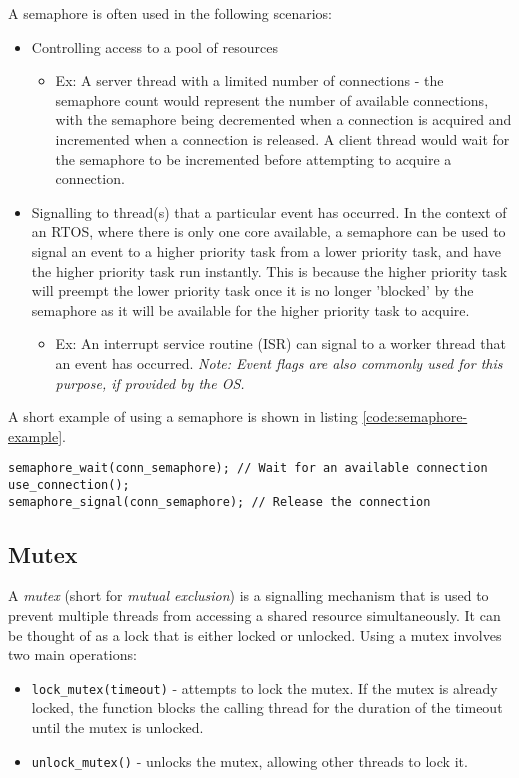 \documentclass[main.tex]{subfiles}
\begin{document}
\noindent A semaphore is often used in the following scenarios:
\begin{itemize}
    \item Controlling access to a pool of resources 
    \begin{itemize}
        \item Ex: A server thread with a limited number of connections - the semaphore count would represent the number of available connections, with the semaphore being decremented when a connection is acquired and incremented when a connection is released. A client thread would wait for the semaphore to be incremented before attempting to acquire a connection.
    \end{itemize}
    \item Signalling to thread(s) that a particular event has occurred. In the context of an RTOS, where there is only one core available, a semaphore can be used to signal an event to a higher priority task from a lower priority task, and have the higher priority task run instantly. This is because the higher priority task will preempt the lower priority task once it is no longer 'blocked' by the semaphore as it will be available for the higher priority task to acquire.
    \begin {itemize}
        \item Ex: An interrupt service routine (ISR) can signal to a worker thread that an event has occurred. \textit{Note: Event flags are also commonly used for this purpose, if provided by the OS.}
    \end{itemize}
\end{itemize}
A short example of using a semaphore is shown in listing \ref{code:semaphore-example}.
\begin{lstlisting}[caption={Example of Semaphore Usage}, label={code:semaphore-example}]
semaphore_wait(conn_semaphore); // Wait for an available connection
use_connection();
semaphore_signal(conn_semaphore); // Release the connection
\end{lstlisting}    

\subsection{Mutex}
A \textit{mutex} (short for \textit{mutual exclusion}) is a signalling mechanism that is used to prevent multiple threads from accessing a shared resource simultaneously. It can be thought of as a lock that is either locked or unlocked.
\newline
\newline
\noindent Using a mutex involves two main operations: \begin{itemize}
    \item \texttt{lock\_mutex(timeout)} - attempts to lock the mutex. If the mutex is already locked, the function blocks the calling thread for the duration of the timeout until the mutex is unlocked.
    \item \texttt{unlock\_mutex()} - unlocks the mutex, allowing other threads to lock it.
\end{itemize}
\end{document}
